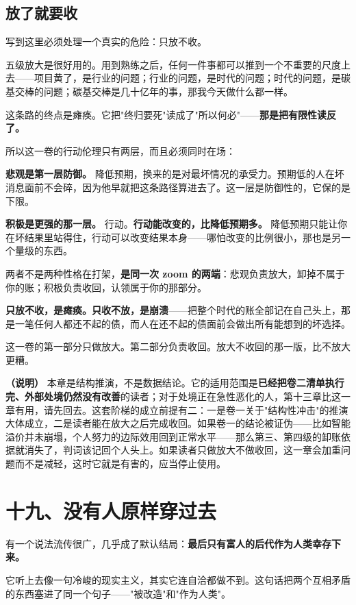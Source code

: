 \documentclass[11pt,a4paper]{ctexart}
\begin{document}
\subsection{放了就要收}

写到这里必须处理一个真实的危险：只放不收。

五级放大是很好用的。用到熟练之后，任何一件事都可以推到一个不重要的尺度上去——项目黄了，是行业的问题；行业的问题，是时代的问题；时代的问题，是碳基交棒的问题；碳基交棒是几十亿年的事，那我今天做什么都一样。

这条路的终点是瘫痪。它把"终归要死"读成了"所以何必"——\textbf{那是把有限性读反了。}

所以这一卷的行动伦理只有两层，而且必须同时在场：

\textbf{悲观是第一层防御。} 降低预期，换来的是对最坏情况的承受力。预期低的人在坏消息面前不会碎，因为他早就把这条路径算进去了。这一层是防御性的，它保的是下限。

\textbf{积极是更强的那一层。} 行动。\textbf{行动能改变的，比降低预期多。} 降低预期只能让你在坏结果里站得住，行动可以改变结果本身——哪怕改变的比例很小，那也是另一个量级的东西。

两者不是两种性格在打架，\textbf{是同一次 zoom 的两端}：悲观负责放大，卸掉不属于你的账；积极负责收回，认领属于你的那部分。

\textbf{只放不收，是瘫痪。只收不放，是崩溃}——把整个时代的账全部记在自己头上，那是一笔任何人都还不起的债，而人在还不起的债面前会做出所有能想到的坏选择。

这一卷的第一部分只做放大。第二部分负责收回。放大不收回的那一版，比不放大更糟。

\textbf{（说明）} 本章是结构推演，不是数据结论。它的适用范围是\textbf{已经把卷二清单执行完、外部处境仍然没有改善}的读者；对于处境正在急性恶化的人，第十三章比这一章有用，请先回去。这套阶梯的成立前提有二：一是卷一关于"结构性冲击"的推演大体成立，二是读者能在放大之后完成收回。如果卷一的结论被证伪——比如智能溢价并未崩塌，个人努力的边际效用回到正常水平——那么第三、第四级的卸账依据就消失了，判词该记回个人头上。如果读者只做放大不做收回，这一章会加重问题而不是减轻，这时它就是有害的，应当停止使用。

\section{十九、没有人原样穿过去}

有一个说法流传很广，几乎成了默认结局：\textbf{最后只有富人的后代作为人类幸存下来。}

它听上去像一句冷峻的现实主义，其实它连自洽都做不到。这句话把两个互相矛盾的东西塞进了同一个句子——"被改造"和"作为人类"。
\end{document}
